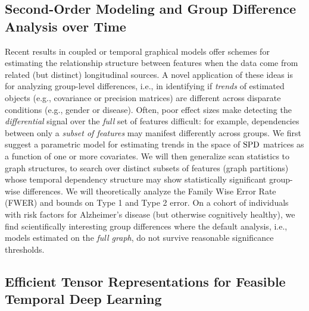 \subsection{Second-Order Modeling and Group Difference Analysis over Time}

Recent results in coupled or temporal graphical models offer schemes for estimating the relationship structure 
between features when the data come from
related (but distinct) longitudinal sources. A novel application of these ideas is for analyzing group-level differences, i.e., in identifying if {\em trends} of estimated objects (e.g., 
covariance or precision matrices) are different across disparate conditions (e.g., gender or disease). Often, poor effect sizes make detecting the \textit{differential} signal 
over the {\em full} set of features difficult: for example, 
dependencies between only a {\em subset of features} may manifest differently across groups.
We first suggest
a parametric model 
for estimating trends in the space of $\text{SPD}$ matrices as a function of one or more covariates.
We will then generalize scan statistics to graph structures, 
to search over distinct subsets of features (graph partitions) whose temporal dependency structure may show statistically 
significant group-wise differences.
We will theoretically analyze the Family Wise Error Rate (FWER) and bounds on Type 1 and Type 2 error. 
On a cohort of individuals with risk factors for Alzheimer's disease (but otherwise cognitively healthy), 
we 
find scientifically interesting 
group differences where the default analysis, 
i.e., models estimated on the {\em full graph}, do not survive reasonable 
significance thresholds. 


\subsection{Efficient Tensor Representations for Feasible Temporal Deep Learning}

